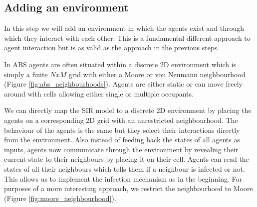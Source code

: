 \subsection{Adding an environment}
\label{sec:step5_environment}
In this step we will add an environment in which the agents exist and through which they interact with each other. This is a fundamental different approach to agent interaction but is as valid as the approach in the previous steps.

In ABS agents are often situated within a discrete 2D environment \cite{epstein_growing_1996} which is simply a finite $N x M$ grid with either a Moore or von Neumann neighbourhood (Figure \ref{fig:abs_neighbourhoods}). Agents are either static or can move freely around with cells allowing either single or multiple occupants.

We can directly map the SIR model to a discrete 2D environment by placing the agents on a corresponding 2D grid with an unrestricted neighbourhood. The behaviour of the agents is the same but they select their interactions directly from the environment. Also instead of feeding back the states of all agents as inputs, agents now communicate through the environment by revealing their current state to their neighbours by placing it on their cell. Agents can read the states of all their neighbours which tells them if a neighbour is infected or not. This allows us to implement the infection mechanism as in the beginning. For purposes of a more interesting approach, we restrict the neighbourhood to Moore (Figure \ref{fig:moore_neighbourhood}).

